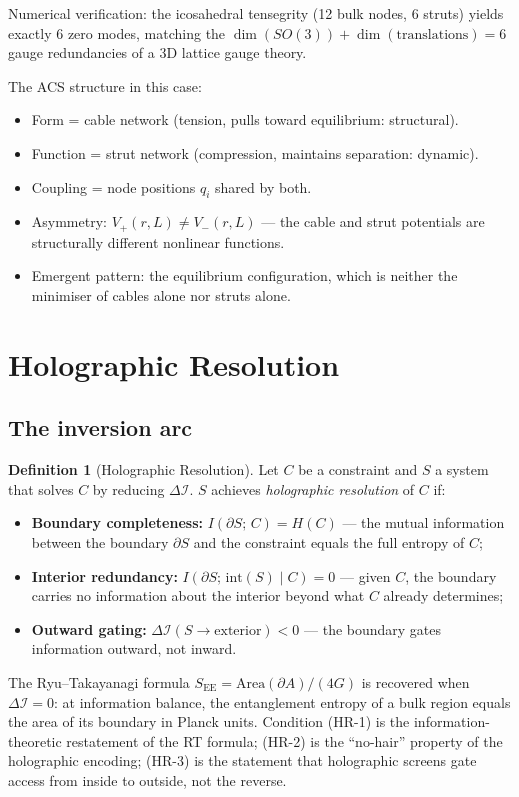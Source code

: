 \documentclass[11pt,a4paper]{article}
\theoremstyle{plain}
\theoremstyle{definition}
\newtheorem{definition}[theorem]{Definition}
\theoremstyle{remark}
\newcommand{\DI}{\Delta\mathcal{I}}
\begin{document}
\noindent
Numerical verification: the icosahedral tensegrity (12 bulk nodes, 6 struts) 
yields exactly 6 zero modes, matching the $\dim(SO(3)) + \dim(\mathrm{translations}) = 6$ 
gauge redundancies of a 3D lattice gauge theory.

The ACS structure in this case:
\begin{itemize}[noitemsep]
  \item Form = cable network (tension, pulls toward equilibrium: structural).
  \item Function = strut network (compression, maintains separation: dynamic).
  \item Coupling = node positions $q_i$ shared by both.
  \item Asymmetry: $V_+(r,L) \neq V_-(r,L)$ --- the cable and strut potentials 
    are structurally different nonlinear functions.
  \item Emergent pattern: the equilibrium configuration, which is 
    neither the minimiser of cables alone nor struts alone.
\end{itemize}

\section{Holographic Resolution}
\label{sec:holographic}

\subsection{The inversion arc}

\begin{definition}[Holographic Resolution]\label{def:holo}
Let $C$ be a constraint and $S$ a system that solves $C$
by reducing $\DI$.  $S$ achieves \emph{holographic resolution} of $C$ if:
\begin{itemize}[noitemsep]
  \item[(HR-1)] \textbf{Boundary completeness:}
    $I(\partial S;\, C) = H(C)$
    --- the mutual information between the boundary $\partial S$ and
    the constraint equals the full entropy of $C$;
  \item[(HR-2)] \textbf{Interior redundancy:}
    $I(\partial S;\, \mathrm{int}(S) \mid C) = 0$
    --- given $C$, the boundary carries no information about the interior
    beyond what $C$ already determines;
  \item[(HR-3)] \textbf{Outward gating:}
    $\DI(S \to \mathrm{exterior}) < 0$
    --- the boundary gates information outward, not inward.
\end{itemize}
The Ryu--Takayanagi formula $S_{\mathrm{EE}} = \mathrm{Area}(\partial A)/(4G)$
is recovered when $\DI = 0$: at information balance, the entanglement
entropy of a bulk region equals the area of its boundary in Planck units.
Condition (HR-1) is the information-theoretic restatement of the
RT formula; (HR-2) is the ``no-hair'' property of the holographic encoding;
(HR-3) is the statement that holographic screens gate access from
inside to outside, not the reverse.
\end{definition}
\end{document}
